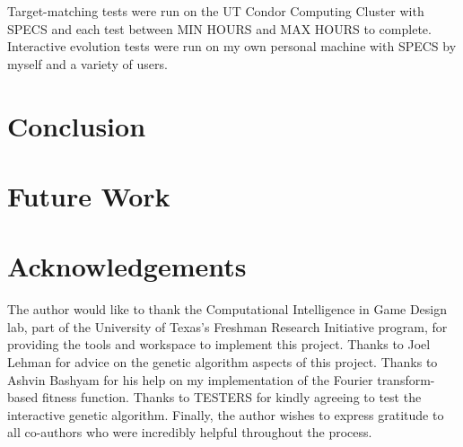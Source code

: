 \documentclass[12pt]{article}
\begin{document}
Target-matching tests were run on the UT Condor Computing Cluster with SPECS and each test between MIN HOURS and MAX HOURS to complete. Interactive evolution tests were run on my own personal machine with SPECS by myself and a variety of users.

\section{Conclusion}

\section{Future Work}

\section{Acknowledgements}
The author would like to thank the Computational Intelligence in Game Design lab, part of the University of Texas's Freshman Research Initiative program, for providing the tools and workspace to implement this project. Thanks to Joel Lehman for advice on the genetic algorithm aspects of this project. Thanks to Ashvin Bashyam for his help on my implementation of the Fourier transform-based fitness function. Thanks to TESTERS for kindly agreeing to test the interactive genetic algorithm. Finally, the author wishes to express gratitude to all co-authors who were incredibly helpful throughout the process.






\end{document}
